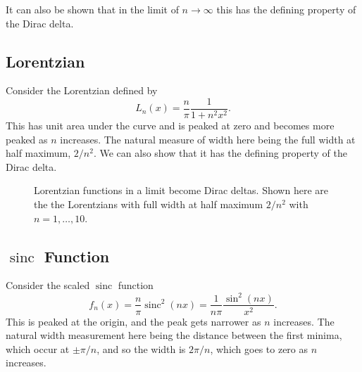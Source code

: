 \documentclass[fleqn]{NotesClass}
\DeclareMathOperator{\sinc}{sinc}
\begin{document}
    It can also be shown that in the limit of \(n \to \infty\) this has the defining property of the Dirac delta.
    
    \subsection{Lorentzian}
    Consider the Lorentzian defined by
    \begin{equation}
        L_n(x) = \frac{n}{\pi} \frac{1}{1 + n^2x^2}.
    \end{equation}
    This has unit area under the curve and is peaked at zero and becomes more peaked as \(n\) increases.
    The natural measure of width here being the full width at half maximum, \(2/n^2\).
    We can also show that it has the defining property of the Dirac delta.
    
    \begin{figure}
    \caption{Lorentzian functions in a limit become Dirac deltas. Shown here are the the Lorentzians with full width at half maximum \(2/n^2\) with \(n = 1, \dotsc, 10\).}
    \end{figure}
    
    \subsection{\texorpdfstring{\(\sinc\)}{sinc} Function}
    Consider the scaled \(\sinc\) function
    \begin{equation}
        f_n(x) = \frac{n}{\pi}\sinc^2(nx) = \frac{1}{n\pi} \frac{\sin^2(n x)}{x^2}.
    \end{equation}
    This is peaked at the origin, and the peak gets narrower as \(n\) increases.
    The natural width measurement here being the distance between the first minima, which occur at \(\pm \pi/n\), and so the width is \(2\pi/n\), which goes to zero as \(n\) increases.
    
\end{document}
